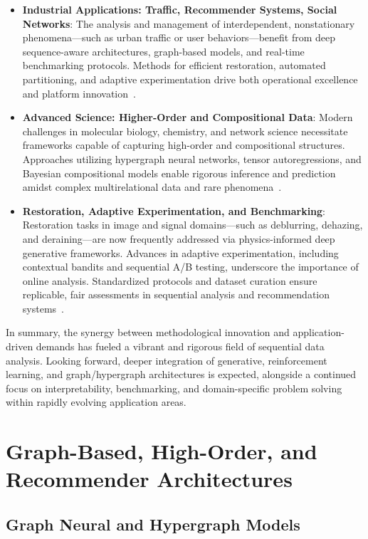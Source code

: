 \begin{itemize}
    \item \textbf{Industrial Applications: Traffic, Recommender Systems, Social Networks}: The analysis and management of interdependent, nonstationary phenomena—such as urban traffic or user behaviors—benefit from deep sequence-aware architectures, graph-based models, and real-time benchmarking protocols. Methods for efficient restoration, automated partitioning, and adaptive experimentation drive both operational excellence and platform innovation~\cite{ref2,ref9,ref47,ref58,ref85,ref87}.
    
    \item \textbf{Advanced Science: Higher-Order and Compositional Data}: Modern challenges in molecular biology, chemistry, and network science necessitate frameworks capable of capturing high-order and compositional structures. Approaches utilizing hypergraph neural networks, tensor autoregressions, and Bayesian compositional models enable rigorous inference and prediction amidst complex multirelational data and rare phenomena~\cite{ref58,ref59,ref60,ref61,ref65,ref74}.
    
    \item \textbf{Restoration, Adaptive Experimentation, and Benchmarking}: Restoration tasks in image and signal domains—such as deblurring, dehazing, and deraining—are now frequently addressed via physics-informed deep generative frameworks. Advances in adaptive experimentation, including contextual bandits and sequential A/B testing, underscore the importance of online analysis. Standardized protocols and dataset curation ensure replicable, fair assessments in sequential analysis and recommendation systems~\cite{ref74,ref80,ref81,ref85,ref86,ref87}.
\end{itemize}

\noindent In summary, the synergy between methodological innovation and application-driven demands has fueled a vibrant and rigorous field of sequential data analysis. Looking forward, deeper integration of generative, reinforcement learning, and graph/hypergraph architectures is expected, alongside a continued focus on interpretability, benchmarking, and domain-specific problem solving within rapidly evolving application areas.

\section{Graph-Based, High-Order, and Recommender Architectures}

\subsection{Graph Neural and Hypergraph Models}

